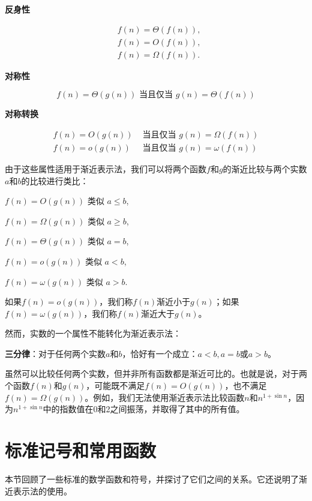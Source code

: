 \documentclass[lang=cn,newtx,10pt,scheme=chinese]{elegantbook}
\begin{document}
\textbf{反身性}

\begin{equation*}
\begin{aligned}
& f(n)=\Theta(f(n)), \\
& f(n)=O(f(n)), \\
& f(n)=\Omega(f(n)) .
\end{aligned}
\end{equation*}

\textbf{对称性}

$$
f(n)=\Theta(g(n)) \text { 当且仅当 } g(n)=\Theta(f(n))
$$

\textbf{对称转换}

\begin{equation*}
\begin{array}{ll}
f(n)=O(g(n)) & \text { 当且仅当 } g(n)=\Omega(f(n)) \\
f(n)=o(g(n)) & \text { 当且仅当 } g(n)=\omega(f(n))
\end{array}
\end{equation*}

由于这些属性适用于渐近表示法，我们可以将两个函数$f$和$g$的渐近比较与两个实数$a$和$b$的比较进行类比：

$f(n)=O(g(n))$ 类似 $a \leq b$,

$f(n)=\Omega(g(n))$ 类似 $a \geq b$,

$f(n)=\Theta(g(n))$ 类似 $a=b$,

$f(n)=o(g(n))$ 类似 $a<b$,

$f(n)=\omega(g(n))$ 类似 $a>b$.

如果$f(n)=o(g(n))$，我们称$f(n)$渐近小于$g(n)$；如果$f(n)=\omega(g(n))$，我们称$f(n)$渐近大于$g(n)$。

然而，实数的一个属性不能转化为渐近表示法：

\textbf{三分律}：对于任何两个实数$a$和$b$，恰好有一个成立：$a<b, a=b$或$a>b$。

虽然可以比较任何两个实数，但并非所有函数都是渐近可比的。也就是说，对于两个函数$f(n)$和$g(n)$，可能既不满足$f(n)=O(g(n))$，也不满足$f(n)=\Omega(g(n))$。例如，我们无法使用渐近表示法比较函数$n$和$n^{1+\sin n}$，因为$n^{1+\sin n}$中的指数值在0和2之间振荡，并取得了其中的所有值。

\section{标准记号和常用函数}\label{section-3.3}

本节回顾了一些标准的数学函数和符号，并探讨了它们之间的关系。它还说明了渐近表示法的使用。
\end{document}
